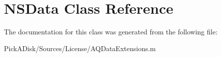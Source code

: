 \hypertarget{class_n_s_data}{
\section{NSData Class Reference}
\label{class_n_s_data}
}


The documentation for this class was generated from the following file:\begin{DoxyCompactItemize}
\item 
PickADisk/Sources/License/AQDataExtensions.m\end{DoxyCompactItemize}
